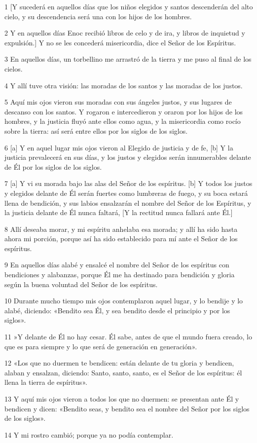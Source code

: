 \par 1 [Y sucederá en aquellos días que los niños elegidos y santos descenderán del alto cielo, y su descendencia será una con los hijos de los hombres.
\par 2 Y en aquellos días Enoc recibió libros de celo y de ira, y libros de inquietud y expulsión.] Y no se les concederá misericordia, dice el Señor de los Espíritus.
\par 3 En aquellos días, un torbellino me arrastró de la tierra y me puso al final de los cielos.
\par 4 Y allí tuve otra visión: las moradas de los santos y las moradas de los justos.
\par 5 Aquí mis ojos vieron sus moradas con sus ángeles justos, y sus lugares de descanso con los santos. Y rogaron e intercedieron y oraron por los hijos de los hombres, y la justicia fluyó ante ellos como agua, y la misericordia como rocío sobre la tierra: así será entre ellos por los siglos de los siglos.
\par 6 [a] Y en aquel lugar mis ojos vieron al Elegido de justicia y de fe, [b] Y la justicia prevalecerá en sus días, y los justos y elegidos serán innumerables delante de Él por los siglos de los siglos.
\par 7 [a] Y vi su morada bajo las alas del Señor de los espíritus. [b] Y todos los justos y elegidos delante de Él serán fuertes como lumbreras de fuego, y su boca estará llena de bendición, y sus labios ensalzarán el nombre del Señor de los Espíritus, y la justicia delante de Él nunca faltará, [Y la rectitud nunca fallará ante Él.]
\par 8 Allí deseaba morar, y mi espíritu anhelaba esa morada; y allí ha sido hasta ahora mi porción, porque así ha sido establecido para mí ante el Señor de los espíritus.
\par 9 En aquellos días alabé y ensalcé el nombre del Señor de los espíritus con bendiciones y alabanzas, porque Él me ha destinado para bendición y gloria según la buena voluntad del Señor de los espíritus.
\par 10 Durante mucho tiempo mis ojos contemplaron aquel lugar, y lo bendije y lo alabé, diciendo: «Bendito sea Él, y sea bendito desde el principio y por los siglos».
\par 11 »Y delante de Él no hay cesar. Él sabe, antes de que el mundo fuera creado, lo que es para siempre y lo que será de generación en generación».
\par 12 «Los que no duermen te bendicen: están delante de tu gloria y bendicen, alaban y ensalzan, diciendo: Santo, santo, santo, es el Señor de los espíritus: él llena la tierra de espíritus».
\par 13 Y aquí mis ojos vieron a todos los que no duermen: se presentan ante Él y bendicen y dicen: «Bendito seas, y bendito sea el nombre del Señor por los siglos de los siglos».
\par 14 Y mi rostro cambió; porque ya no podía contemplar.

